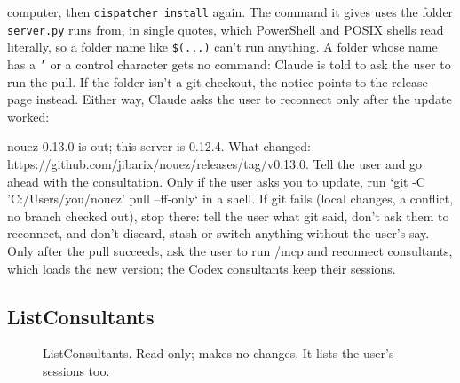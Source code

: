 \documentclass[10pt,a4paper]{article}
\newcommand{\lifelines}[2]{%
  \foreach \x/\name/\col in {#1} {%
    \node[actor, draw=\col, text=\col] at (\x,0) {\name};
    \draw[lifeline] (\x,-0.4) -- (\x,-#2);
  }}
\newcommand{\msg}[4]{\draw[call] (#2,-#1) -- node[above=1pt,lbl]{#4} (#3,-#1);}
\newcommand{\ret}[4]{\draw[reply] (#2,-#1) -- node[above=1pt,lbl]{#4} (#3,-#1);}
\newcommand{\side}[3]{\node[note, anchor=west] at (#2+0.15,-#1) {#3};}
\newcommand{\code}[1]{\texttt{#1}}
\begin{document}
computer, then \code{dispatcher install} again. The command it gives uses the folder
\code{server.py} runs from, in single quotes, which PowerShell and POSIX shells read literally,
so a folder name like \code{\$(...)} can't run anything. A folder whose name has a \code{'} or a
control character gets no command: Claude is told to ask the user to run the pull. If the folder
isn't a git checkout, the notice points to the release page instead. Either way, Claude asks the
user to reconnect only after the update worked:
\begin{plain}
nouez 0.13.0 is out; this server is 0.12.4. What changed: https://github.com/jibarix/nouez/releases/tag/v0.13.0. Tell the user and go ahead with the consultation. Only if the user asks you to update, run `git -C 'C:/Users/you/nouez' pull --ff-only` in a shell. If git fails (local changes, a conflict, no branch checked out), stop there: tell the user what git said, don't ask them to reconnect, and don't discard, stash or switch anything without the user's say. Only after the pull succeeds, ask the user to run /mcp and reconnect consultants, which loads the new version; the Codex consultants keep their sessions.
\end{plain}

\subsection{ListConsultants}

\begin{figure}[H]
\centering
{}
\caption{ListConsultants. Read-only; makes no changes. It lists the user's sessions too.}
\end{figure}
\end{document}
